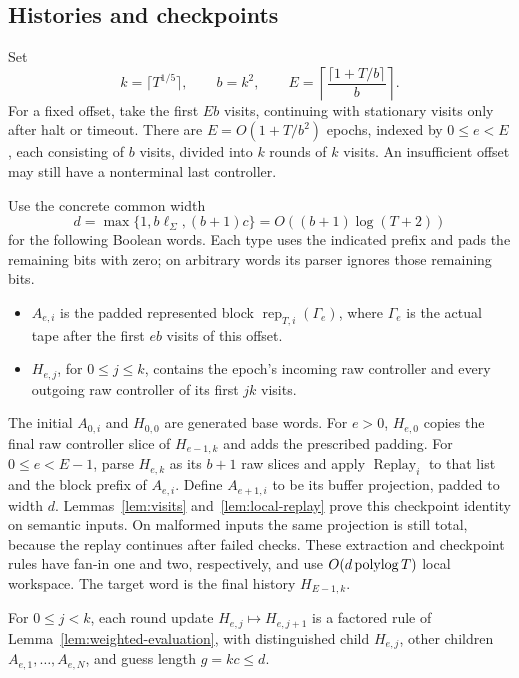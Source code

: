 \subsection{Histories and checkpoints}
\label{sec:histories}

Set
\[
 k=\lceil T^{1/5}\rceil,\qquad b=k^2,\qquad
 E=\left\lceil\frac{\lceil1+T/b\rceil}{b}\right\rceil.
\]
For a fixed offset, take the first \(Eb\) visits, continuing with
stationary visits only after halt or timeout. There are
\(E=O(1+T/b^2)\) epochs, indexed by \(0\le e<E\), each consisting
of \(b\) visits, divided into
\(k\) rounds of \(k\) visits. An insufficient offset may still have
a nonterminal last controller.

Use the concrete common width
\begin{equation}\label{eq:word-width}
 d=\max\{1,b\ell_\Sigma,(b+1)c\}
   =O((b+1)\log(T+2))
\end{equation}
for the following Boolean words. Each type uses the indicated prefix
and pads the remaining bits with zero; on arbitrary words its parser
ignores those remaining bits.
\begin{itemize}
\item \(A_{e,i}\) is the padded represented block
\(\operatorname{rep}_{T,i}(\Gamma_e)\), where \(\Gamma_e\) is the actual
tape after the first \(eb\) visits of this offset.
\item \(H_{e,j}\), for \(0\le j\le k\), contains the epoch's incoming
raw controller and every outgoing raw controller of its first \(jk\)
visits.
\end{itemize}
The initial \(A_{0,i}\) and \(H_{0,0}\) are generated base words.
For \(e>0\), \(H_{e,0}\) copies the final raw controller slice of
\(H_{e-1,k}\) and adds the prescribed padding. For \(0\le e<E-1\),
parse \(H_{e,k}\) as its \(b+1\) raw slices and apply
\(\operatorname{Replay}_i\) to that list and the block prefix of
\(A_{e,i}\). Define \(A_{e+1,i}\) to be its buffer projection, padded
to width \(d\). Lemmas~\ref{lem:visits} and~\ref{lem:local-replay} prove
this checkpoint identity on semantic inputs. On malformed inputs the same projection
is still total, because the replay continues after failed checks.
These extraction and checkpoint rules have fan-in one and two,
respectively, and use \(O(d\operatorname{polylog} T)\) local workspace.
The target word is the final history \(H_{E-1,k}\).

\begin{lemma}
\label{lem:factored-history}
For \(0\le j<k\), each round update \(H_{e,j}\mapsto H_{e,j+1}\)
is a factored rule
of Lemma~\ref{lem:weighted-evaluation}, with distinguished child
\(H_{e,j}\), other children \(A_{e,1},\ldots,A_{e,N}\), and guess
length \(g=kc\le d\).
\end{lemma}

